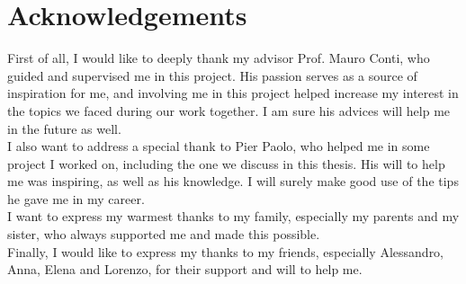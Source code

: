 
\cleardoublepage
{}
{}


\medskip

\begingroup
\let\clearpage\relax
\let\cleardoublepage\relax
\let\cleardoublepage\relax

\chapter*{Acknowledgements}

\noindent  First of all, I would like to deeply thank my advisor Prof. Mauro Conti, who guided and supervised me in this project. His passion serves as a source of inspiration for me, and involving me in this project helped increase my interest
in the topics we faced during our work together. I am sure his advices will help me in the future as well.\\

\noindent  I also want to address a special thank to Pier Paolo, who helped me in some project I worked on, including the one we discuss in this thesis. His will to help me was inspiring, as well as his knowledge. I will surely make good use 
of the tips he gave me in my career.\\

\noindent I want to express my warmest thanks to my family, especially my parents and my sister, who always supported me and made this possible.\\

\noindent Finally, I would like to express my thanks to my friends, especially Alessandro, Anna, Elena and Lorenzo, for their support and will to help me.\\
\bigskip

\endgroup

